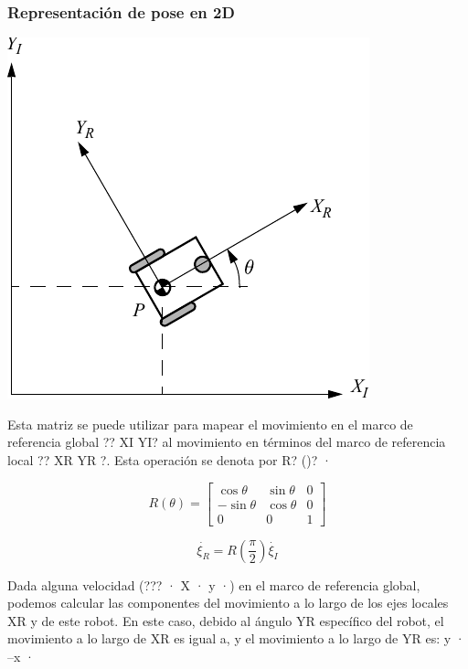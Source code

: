 \begin{frame}
    \frametitle{Representación de pose en 2D}
    \footnotesize

    \begin{center}
        \includegraphics[width=0.4\columnwidth]{./images/coordinate_systems.pdf}
    \end{center}

    Esta matriz se puede utilizar para mapear el movimiento en el marco de referencia global ?? XI YI? al movimiento en términos del marco de referencia local ?? XR YR ?. Esta operación se denota por R? ()? ·

    \begin{equation*}
        R(\theta)=\begin{bmatrix}
            \cos\theta & \sin\theta & 0\\
            -\sin \theta & \cos \theta & 0\\
            0 & 0 & 1
        \end{bmatrix}
    \end{equation*}

    \begin{equation*}
        \dot{\xi_R} = R(\dfrac{\pi}{2}) \dot{\xi_I}
    \end{equation*}

    Dada alguna velocidad (??? · X · y ·) en el marco de referencia global, podemos calcular las componentes del movimiento a lo largo de los ejes locales XR y de este robot. En este caso, debido al ángulo YR específico del robot, el movimiento a lo largo de XR es igual a, y el movimiento a lo largo de YR es: y · –x ·

\end{frame}

